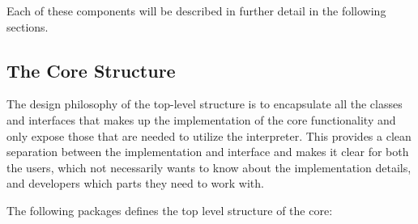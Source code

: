 \documentclass[a4paper, 12pt]{include/compassreport}   %
\begin{document}
Each of these components will be described in further detail in the
following sections.

\subsection{The Core Structure}

The design philosophy of the top-level structure is to encapsulate all
the classes and interfaces that makes up the implementation of the
core functionality and only expose those that are needed to utilize
the interpreter. This provides a clean separation between the
implementation and interface and makes it clear for both the users,
which not necessarily wants to know about the implementation details,
and developers which parts they need to work with.
 
The following packages defines the top level structure of the core:
\end{document}
